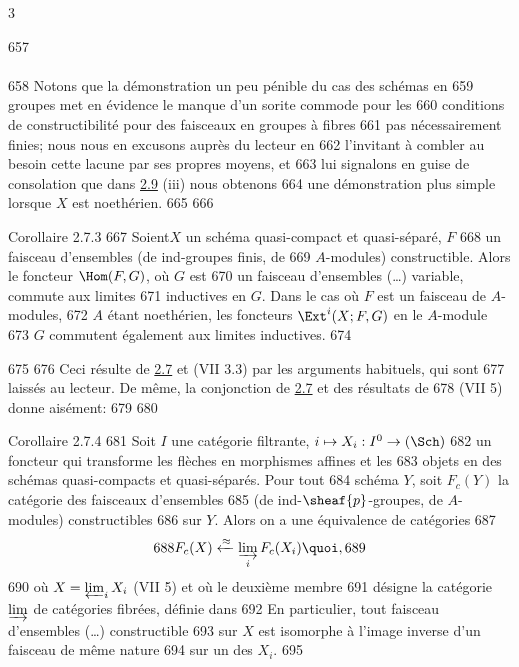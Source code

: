 3	\documentclass[10pt]{../fichiers-configuration-latex/smfart}
\begin{document}
   657	\paragraph{}
   658	Notons que la démonstration un peu pénible du cas des schémas en
   659	groupes met en évidence le manque d'un sorite commode pour les
   660	conditions de constructibilité pour des faisceaux en groupes à fibres
   661	pas nécessairement finies; nous nous en excusons auprès du lecteur en
   662	l'invitant à combler au besoin cette lacune par ses propres moyens, et
   663	lui signalons en guise de consolation que dans \hyperref[IX.prop2.9]{2.9} (iii) nous obtenons
   664	une démonstration plus simple lorsque $X$ est noethérien.
   665	
   666	\begin{enonce*}{Corollaire 2.7.3}
   667	Soient\pageoriginale $X$ un schéma quasi-compact et quasi-séparé, $F$
   668	un faisceau d'ensembles (\resp de ind-groupes finis, \resp de
   669	$A$-modules) constructible. Alors le foncteur $\Hom(F,G)$, où $G$ est
   670	un faisceau d'ensembles (\resp\ldots) variable, commute aux limites
   671	inductives en $G$. Dans le cas où $F$ est un faisceau de $A$-modules,
   672	$A$ étant noethérien, les foncteurs $\Ext^{i}(X;F,G)$ en le $A$-module
   673	$G$ commutent également aux limites inductives.
   674	\end{enonce*}
   675	
   676	Ceci résulte de \hyperref[IX.prop2.7]{2.7} et (VII 3.3) par les arguments habituels, qui sont
   677	laissés au lecteur. De même, la conjonction de \hyperref[IX.prop2.7]{2.7} et des résultats de
   678	(VII 5) donne aisément:
   679	
   680	\begin{enonce*}{Corollaire 2.7.4}
   681	Soit $I$ une catégorie filtrante, $i\mapsto X_i:I^0\rightarrow (\Sch)$
   682	un foncteur qui transforme les flèches en morphismes affines et les
   683	objets en des schémas quasi-compacts et quasi-séparés. Pour tout
   684	schéma $Y$, soit $F_{c}(Y)$ la catégorie des faisceaux d'ensembles
   685	(\resp de ind-$\sheaf{p}$-groupes, \resp de $A$-modules) constructibles
   686	sur $Y$. Alors on a une équivalence de catégories
   687	$$
   688	F_{c}(X)\xleftarrow{\approx}\varinjlim_i F_{c}(X_i){\quoi},
   689	$$
   690	où $X=\varprojlim_i X_i$ {\rm (VII 5)} et où le deuxième membre
   691	désigne la catégorie $\varinjlim$ de catégories fibrées, définie dans\hspace{1cm}
   692	En particulier, tout faisceau d'ensembles (\resp\ldots) constructible
   693	sur $X$ est isomorphe à l'image inverse d'un faisceau de même nature
   694	sur un des $X_i$.
   695	\end{enonce*}
\end{document}
